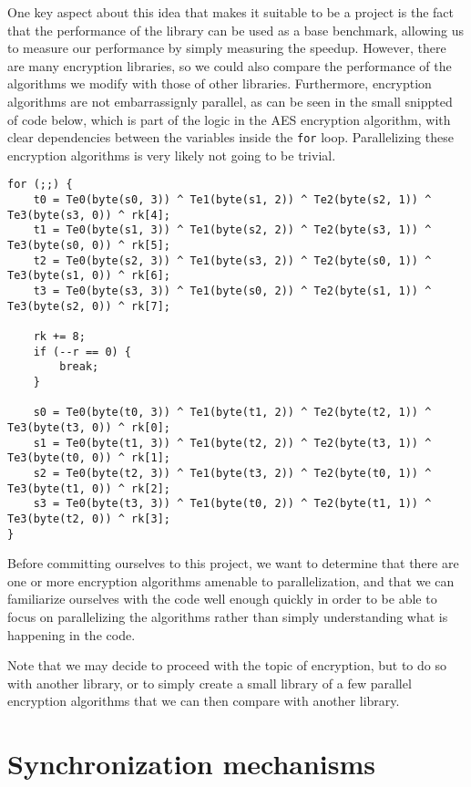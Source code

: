 \documentclass[11pt]{article}
\begin{document}
One key aspect about this idea that makes it suitable to be a project is the
fact that the performance of the library can be used as a base benchmark,
allowing us to measure our performance by simply measuring the speedup. However,
there are many encryption libraries, so we could also compare the performance of
the algorithms we modify with those of other libraries. Furthermore, encryption
algorithms are not embarrassignly parallel, as can be seen in the small snippted
of code below, which is part of the logic in the AES encryption algorithm, with
clear dependencies between the variables inside the \texttt{for} loop. Parallelizing
these encryption algorithms is very likely not going to be trivial.

\begin{lstlisting}
for (;;) {
    t0 = Te0(byte(s0, 3)) ^ Te1(byte(s1, 2)) ^ Te2(byte(s2, 1)) ^ Te3(byte(s3, 0)) ^ rk[4];
    t1 = Te0(byte(s1, 3)) ^ Te1(byte(s2, 2)) ^ Te2(byte(s3, 1)) ^ Te3(byte(s0, 0)) ^ rk[5];
    t2 = Te0(byte(s2, 3)) ^ Te1(byte(s3, 2)) ^ Te2(byte(s0, 1)) ^ Te3(byte(s1, 0)) ^ rk[6];
    t3 = Te0(byte(s3, 3)) ^ Te1(byte(s0, 2)) ^ Te2(byte(s1, 1)) ^ Te3(byte(s2, 0)) ^ rk[7];

    rk += 8;
    if (--r == 0) {
        break;
    }

    s0 = Te0(byte(t0, 3)) ^ Te1(byte(t1, 2)) ^ Te2(byte(t2, 1)) ^ Te3(byte(t3, 0)) ^ rk[0];
    s1 = Te0(byte(t1, 3)) ^ Te1(byte(t2, 2)) ^ Te2(byte(t3, 1)) ^ Te3(byte(t0, 0)) ^ rk[1];
    s2 = Te0(byte(t2, 3)) ^ Te1(byte(t3, 2)) ^ Te2(byte(t0, 1)) ^ Te3(byte(t1, 0)) ^ rk[2];
    s3 = Te0(byte(t3, 3)) ^ Te1(byte(t0, 2)) ^ Te2(byte(t1, 1)) ^ Te3(byte(t2, 0)) ^ rk[3];
}
\end{lstlisting}

Before committing ourselves to this project, we want to determine that there are
one or more encryption algorithms amenable to parallelization, and that we can
familiarize ourselves with the code well enough quickly in order to be able to
focus on parallelizing the algorithms rather than simply understanding what is
happening in the code.

Note that we may decide to proceed with the topic of encryption, but to do so
with another library, or to simply create a small library of a few parallel
encryption algorithms that we can then compare with another library.


\section*{Synchronization mechanisms}
\end{document}
